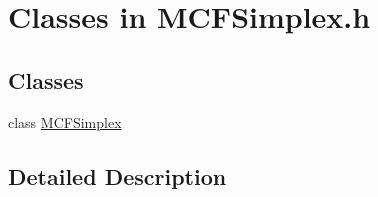 \hypertarget{group___m_c_f_simplex___c_l_a_s_s_e_s}{}\section{Classes in M\+C\+F\+Simplex.\+h}
\label{group___m_c_f_simplex___c_l_a_s_s_e_s}
\subsection*{Classes}
\begin{DoxyCompactItemize}
\item 
class \mbox{\hyperlink{class_m_c_f_simplex}{M\+C\+F\+Simplex}}
\end{DoxyCompactItemize}


\subsection{Detailed Description}
